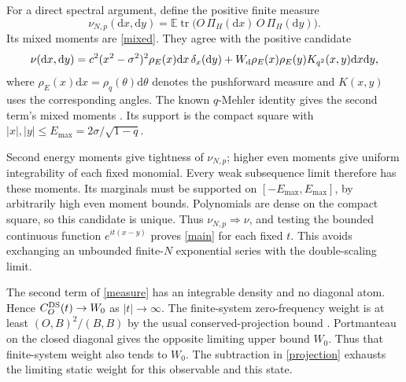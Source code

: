 \documentclass[11pt,a4paper]{article}
\newcommand{\tr}{\operatorname{tr}}
\newcommand{\E}{\mathbb E}
\newcommand{\dd}{\mathrm d}
\begin{document}
For a direct spectral argument, define the positive finite measure
\begin{equation}
 \nu_{N,p}(\dd x,\dd y)=
 \E\tr\bigl(O\,\Pi_H(\dd x)\,O\,\Pi_H(\dd y)\bigr).
\end{equation}
Its mixed moments are \eqref{mixed}. They agree with the positive
candidate
\begin{equation}
 \nu(\dd x,\dd y)=
 c^2(x^2-\sigma^2)^2\rho_E(x)\dd x\,\delta_x(\dd y)
 +W_{\rm d}\rho_E(x)\rho_E(y)K_{q^2}(x,y)\dd x\dd y,\label{measure}
\end{equation}
where $\rho_E(x)\dd x=\rho_q(\theta)\dd\theta$ denotes the pushforward
measure and $K(x,y)$ uses the corresponding angles.
The known $q$-Mehler identity gives the second term's mixed moments
\cite{bint}. Its support is the compact square with
$|x|,|y|\le E_{\max}=2\sigma/\sqrt{1-q}$.

Second energy moments give tightness of $\nu_{N,p}$; higher even
moments give uniform integrability of each fixed monomial. Every weak
subsequence limit therefore has these moments. Its marginals must be
supported on $[-E_{\max},E_{\max}]$, by arbitrarily high even moment
bounds. Polynomials are dense on the compact square, so this candidate
is unique. Thus $\nu_{N,p}\Rightarrow\nu$, and testing the bounded
continuous function $e^{it(x-y)}$ proves \eqref{main} for each fixed $t$.
This avoids exchanging an unbounded finite-$N$ exponential series with
the double-scaling limit.

The second term of \eqref{measure} has an integrable density and no
diagonal atom. Hence $C_O^{\rm DS}(t)\to W_0$ as $|t|\to\infty$.
The finite-system zero-frequency weight is at least
$(O,B)^2/(B,B)$ by the usual conserved-projection bound \cite{mazur}.
Portmanteau on the closed diagonal gives the opposite limiting upper
bound $W_0$. Thus that finite-system weight also tends to $W_0$.
The subtraction in \eqref{projection} exhausts the limiting static weight
for this observable and this state.

\newpage
\end{document}

